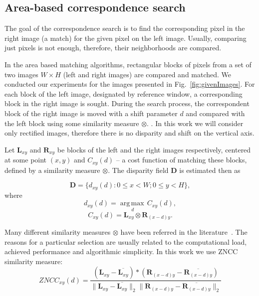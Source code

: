 \documentclass[conference]{IEEEtran}
\newcommand{\argmax}[1]{\underset{#1}{\operatorname{arg\,max\,}}}
\begin{document}
\subsection{Area-based correspondence search}
The goal of the correspondence search is to find the corresponding pixel in the right image (a match) for the given pixel on the left image. Usually, comparing just pixels is not enough, therefore, their neighborhoods are compared.

In the area based matching algorithms, rectangular blocks of pixels from a set of two images $W \times H$ (left and right images) are compared and matched. We conducted our experiments for the images presented in Fig.~\ref{fig:givenImages}. For each block of the left image, designated by reference window, a corresponding block in the right image is sought. During the search process, the correspondent block of the right image is moved with a shift parameter $d$ and compared with the left block using some similarity measure $\otimes$. . In this work we will consider only rectified images, therefore there is no disparity and shift on the vertical axis.

 Let $\mathbf{L}_{xy}$ and $ \mathbf{R}_{xy}$ be blocks of the left and the right images respectively, centered at some point $(x, y)$ and $C_{xy}(d)$ -- a cost function of matching these blocks, defined by a similarity measure $\otimes$. The disparity field $\mathbf{D}$ is estimated then as

\begin{equation}
\mathbf{D} = \{ d_{xy}(d): 0\leq x < W; 0\leq y < H \},
\end{equation}
\noindent where 
\begin{equation}
d_{xy}(d) = \argmax{d}C_{xy}(d),
\end{equation}
\begin{equation}
C_{xy}(d) = \mathbf{L}_{xy}\otimes \mathbf{R}_{(x-d)y}.
\end{equation}

Many different similarity measures $\otimes$ have been referred in the literature~\cite{Redert99}. The reasons for a particular selection are usually related to the computational load, achieved performance and algorithmic simplicity. In this work we use ZNCC similarity measure:
\begin{equation}\label{eq:zncc}
ZNCC_{xy}(d)=\frac{\left(\mathbf{L}_{xy}-\overline{\mathbf{L}_{xy}}\right) * \left(\mathbf{R}_{(x-d)y}-\overline{\mathbf{R}_{(x-d)y}}\right)}
{\|\mathbf{L}_{xy}-\overline{\mathbf{L}_{xy}}\|_2 \|\mathbf{R}_{(x-d)y}-\overline{\mathbf{R}_{(x-d)y}}\|_2}
\end{equation}
\end{document}
